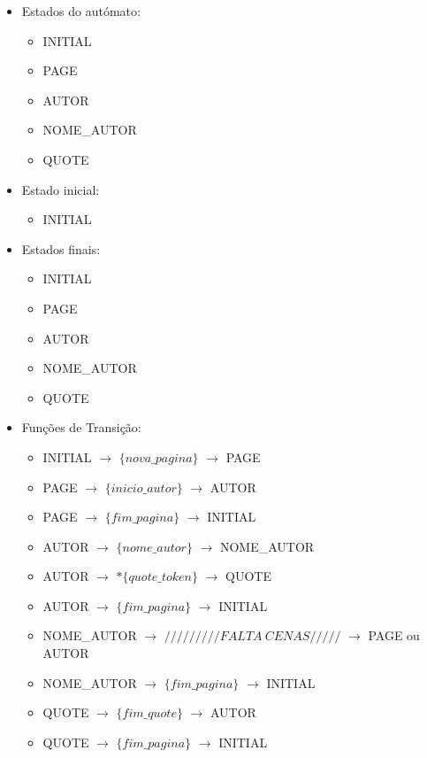 \documentclass[11pt,a4paper]{report}
\begin{document}
\begin{itemize}
	\item Estados do autómato:
		\begin{itemize}
			\item INITIAL
			\item PAGE
			\item AUTOR
			\item NOME\_AUTOR
			\item QUOTE
		\end{itemize}
	\item Estado inicial:
		\begin{itemize}
			\item INITIAL
		\end{itemize}
	\item Estados finais:
		\begin{itemize}
			\item INITIAL
			\item PAGE
			\item AUTOR
			\item NOME\_AUTOR
			\item QUOTE
		\end{itemize}  
	\item Funções de Transição:
		\begin{itemize}
			\item INITIAL $\rightarrow$ $\{nova\_pagina\}$ $\rightarrow$ PAGE
			\item PAGE $\rightarrow$ $\{inicio\_autor\}$ $\rightarrow$ AUTOR
			\item PAGE $\rightarrow$ $\{fim\_pagina\} $ $\rightarrow$ INITIAL
			\item AUTOR $\rightarrow$ $\{nome\_autor\}$ $\rightarrow$ NOME\_AUTOR
			\item AUTOR $\rightarrow$ $*\{quote\_token\}$ $\rightarrow$ QUOTE
			\item AUTOR $\rightarrow$ $\{fim\_pagina\} $ $\rightarrow$ INITIAL
			\item NOME\_AUTOR $\rightarrow$ $ ///////// FALTA\ CENAS///// $ $\rightarrow$ PAGE ou AUTOR
			\item NOME\_AUTOR $\rightarrow$ $\{fim\_pagina\} $ $\rightarrow$ INITIAL
			\item QUOTE $\rightarrow$ $\{fim\_quote\} $ $\rightarrow$ AUTOR
			\item QUOTE $\rightarrow$ $\{fim\_pagina\} $ $\rightarrow$ INITIAL
		\end{itemize}
\end{itemize}
	
\end{document}
